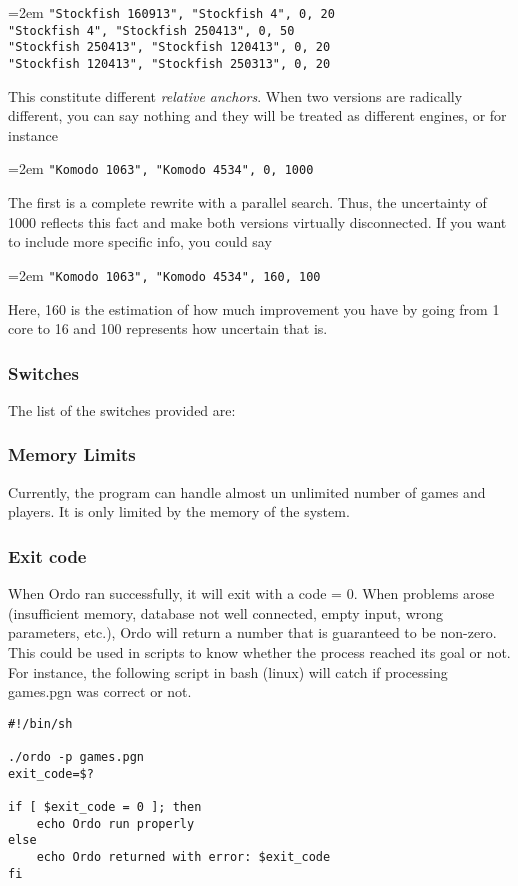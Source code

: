 \documentclass[12pt]{article}
\newcommand{\cmdln}[1]{
	\par
	\begingroup
		\leftskip=2em
		\addtolength{\rightskip}{0em}
		\noindent \small{\texttt{#1}}
		\par
	\endgroup
}
\newcommand{\inctxt}[1]{
	\begingroup
    \fontsize{9pt}{11pt}\selectfont
		 
	\endgroup
}
\begin{document}
\cmdln{"Stockfish 160913", "Stockfish 4",        0, 20\\
"Stockfish 4",      "Stockfish 250413",   0, 50\\
"Stockfish 250413", "Stockfish 120413",   0, 20\\
"Stockfish 120413", "Stockfish 250313",   0, 20}

This constitute different \textit{relative anchors}.
When two versions are radically different, you can say nothing and they will be treated as different engines, or for instance

\cmdln{"Komodo 1063",      "Komodo 4534",        0, 1000}

The first is a complete rewrite with a parallel search. Thus, the uncertainty of 1000 reflects this fact and make both versions virtually disconnected. 
If you want to include more specific info, you could say

\cmdln{"Komodo 1063",      "Komodo 4534",        160, 100}

Here, 160 is the estimation of how much improvement you have by going from 1 core to 16 and 100 represents how uncertain that is. 

\subsubsection*{Switches}

The list of the switches provided are:
\inctxt{tmp-switches.txt}

\subsubsection*{Memory Limits}
Currently, the program can handle almost un unlimited number of games and players. It is only limited by the memory of the system.

\subsubsection*{Exit code}
When Ordo ran successfully, it will exit with a code = 0. 
When problems arose (insufficient memory, database not well connected, empty input, wrong parameters, etc.), Ordo will return a number that is guaranteed to be non-zero.
This could be used in scripts to know whether the process reached its goal or not.
For instance, the following script in bash (linux) will catch if processing games.pgn was correct or not.

\begin{verbatim}
#!/bin/sh

./ordo -p games.pgn
exit_code=$?

if [ $exit_code = 0 ]; then
    echo Ordo run properly
else
    echo Ordo returned with error: $exit_code
fi
\end{verbatim}
\end{document}
